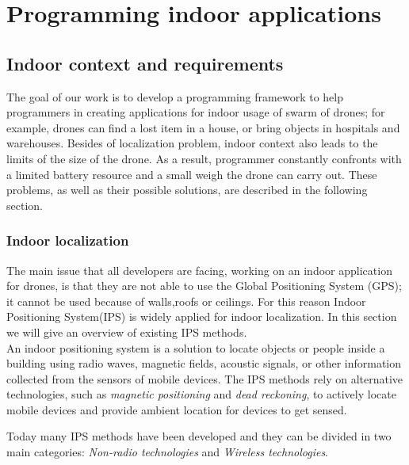\chapter{Programming indoor applications}
\label{cap3}



\section {Indoor context and requirements}

The goal of our work is to develop a programming framework to help programmers in creating applications for indoor usage of swarm of drones; for example, drones can find a lost item in a house, or bring objects in hospitals and warehouses.
Besides of localization problem, indoor context also leads to the limits of the size of the drone. As a result, programmer constantly confronts with a limited battery resource and a small weigh the drone can carry out. These problems, as well as their possible solutions, are described in the following section.

\subsection{Indoor localization}

The main issue that all developers are facing, working on an indoor application for drones, is that they are not able to use the Global Positioning System (GPS); it cannot be used because of walls,roofs or ceilings.
For this reason Indoor Positioning System(IPS) is widely applied for indoor localization. In this section we will give an overview of existing IPS methods.  
\\

An indoor positioning system is a solution to locate objects or people inside a building using radio waves, magnetic fields, acoustic signals, or other information collected from the sensors of mobile devices.
The IPS methods rely on alternative technologies, such as \textit{magnetic positioning} and \textit{dead reckoning}, to actively locate mobile devices and provide ambient location for devices to get sensed.

Today many IPS methods have been developed and they can be divided in two main categories: \textit{Non-radio technologies} and \textit{Wireless technologies}.
\\

